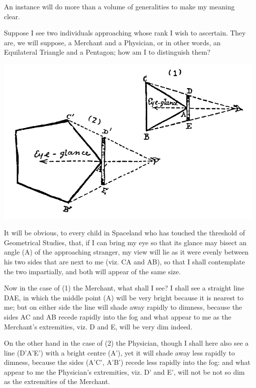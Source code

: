 \documentclass[12pt, a4paper, oneside]{memoir}
\begin{document}
An instance will do more than a volume of generalities to make my meaning
clear.

Suppose I see two individuals approaching whose rank I wish to ascertain. They
are, we will suppose, a Merchant and a Physician, or in other words, an
Equilateral Triangle and a Pentagon; how am I to distinguish them?

\includegraphics[trim=20mm 0mm 0mm 0mm, width=\linewidth]{fig3}

It will be obvious, to every child in Spaceland who has touched the threshold
of Geometrical Studies, that, if I can bring my eye so that its glance may
bisect an angle (A) of the approaching stranger, my view will lie as it were
evenly between his two sides that are next to me (viz. CA and AB), so that I
shall contemplate the two impartially, and both will appear of the same size.

Now in the case of (1) the Merchant, what shall I see? I shall see a straight
line DAE, in which the middle point (A) will be very bright because it is
nearest to me; but on either side the line will shade away rapidly to dimness,
because the sides AC and AB recede rapidly into the fog and what appear to me
as the Merchant's extremities, viz. D and E, will be very dim indeed.

On the other hand in the case of (2) the Physician, though I shall here also
see a line (D'A'E') with a bright centre (A'), yet it will shade away less
rapidly to dimness, because the sides (A'C', A'B') recede less rapidly into
the fog: and what appear to me the Physician's extremities, viz. D' and E',
will not be not so dim as the extremities of the Merchant.
\end{document}

